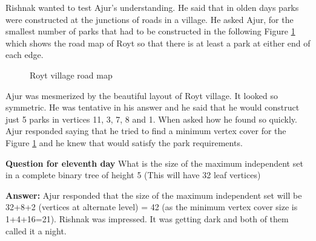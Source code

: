 Rishnak wanted to test Ajur's understanding. He said that in olden days parks were constructed at the junctions of roads in a village. He asked Ajur, for the smallest number of parks that had to be constructed in the following Figure \ref{13g6} which shows the road map of Royt so that there is at least a park at either end of each edge.
\begin{figure}
\begin{center}

\caption{ Royt village road map}\label{13g6}
\end{center}
\end{figure}

Ajur was mesmerized by the beautiful layout of Royt village. It looked so symmetric. He was tentative in his answer and he said that he would construct just 5 parks in vertices 11, 3, 7, 8 and 1.   When asked how he found so quickly. Ajur responded saying that he tried to find a minimum vertex cover for the Figure \ref{13g6} and he knew that would satisfy the park requirements.

\textbf{Question for eleventh day} What is the size of the maximum independent set in a complete binary tree of height 5 (This will have 32 leaf vertices)

\textbf{Answer:} Ajur responded that the size of the maximum independent set will be 32+8+2 (vertices at alternate level) = 42 (as the minimum vertex cover size is 1+4+16=21).
Rishnak was impressed. It was getting dark and both of them called it a night.
